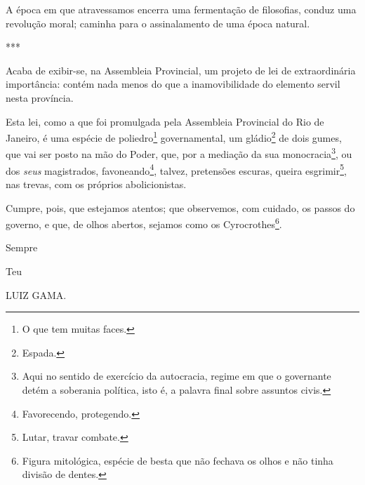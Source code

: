 A época em que atravessamos encerra uma fermentação de filosofias,
conduz uma revolução moral; caminha para o assinalamento de uma época
natural.

***

Acaba de exibir-se, na Assembleia Provincial, um projeto de lei de
extraordinária importância: contém nada menos do que a inamovibilidade
do elemento servil nesta província.

Esta lei, como a que foi promulgada pela Assembleia Provincial do Rio de
Janeiro, é uma espécie de poliedro\footnote{O que tem muitas faces.}
governamental, um gládio\footnote{Espada.} de dois gumes, que vai ser
posto na mão do Poder, que, por a mediação da sua monocracia\footnote{
  Aqui no sentido de exercício da autocracia, regime em que o governante
  detém a soberania política, isto é, a palavra final sobre assuntos
  civis.}, ou dos \emph{seus} magistrados, favoneando\footnote{
  Favorecendo, protegendo.}, talvez, pretensões escuras, queira
esgrimir\footnote{Lutar, travar combate.}, nas trevas, com os próprios
abolicionistas.

Cumpre, pois, que estejamos atentos; que observemos, com cuidado, os
passos do governo, e que, de olhos abertos, sejamos como os
Cyrocrothes\footnote{Figura mitológica, espécie de besta que não
  fechava os olhos e não tinha divisão de dentes.}.

Sempre

Teu

LUIZ GAMA.

\pagebreak
\mbox{}\vfill
\thispagestyle{empty}

